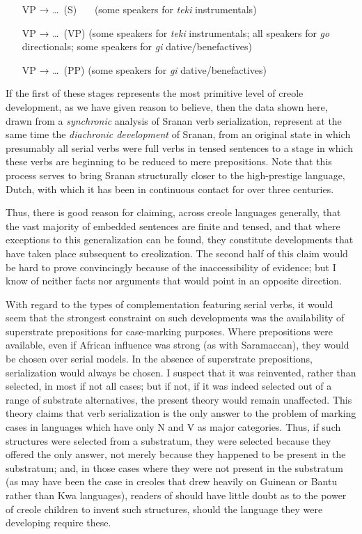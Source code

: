 \ea\label{ex:2:262}
 \hspace{1.5cm}\parbox{9.75cm}{\begin{itemize}
 \item[VP → \ldots~(S)~~~](some speakers for \textit{teki} instrumentals)
 \item[VP → \ldots~(VP)](some speakers for \textit{teki} instrumentals; all speakers for \textit{go} directionals; some speakers for \textit{gi} dative/benefactives)
 \item[VP → \ldots~(PP)](some speakers for \textit{gi} dative/benefactives)
\end{itemize}}
\z

\noindent If the first of these stages represents the most primitive level of creole development, as we have given reason to believe, then the data shown here, drawn from a \textit{synchronic} analysis of Sranan verb serialization, represent at the same time the \textit{diachronic development} of Sranan, from an original state in which presumably all serial verbs were full verbs in tensed sentences to a stage in which these verbs are beginning to be reduced to mere prepositions. Note that this process serves to bring Sranan structurally closer to the high-prestige language, Dutch, with which it has been in continuous contact for over three centuries.

Thus, there is good reason for claiming, across creole languages generally, that the vast majority of embedded sentences are finite and tensed, and that where exceptions to this generalization can be found, they constitute developments that have taken place subsequent to creolization. The second half of this claim would be hard to prove convincingly because of the inaccessibility of evidence; but I know of neither facts nor arguments that would point in an opposite direction.

With regard to the types of complementation featuring serial verbs, it would seem that the strongest constraint on such developments was the availability of superstrate prepositions for case-marking purposes. Where prepositions were available, even if African influence was strong (as with Saramaccan), they would be chosen over serial models. In the absence of superstrate prepositions, serialization would always be chosen. I suspect that it was reinvented, rather than selected,
in most if not all cases; but if not, if it was indeed selected out of a range of substrate alternatives, the present theory would remain unaffected. This theory claims that verb serialization is the only answer to the problem of marking cases in languages which have only N and V as major categories. Thus, if such structures were selected from a substratum, they were selected because they offered the only answer, not merely because they happened to be present in the substratum; and, in those cases where they were not present in the substratum (as may have been the case in creoles that drew heavily on Guinean or Bantu rather than Kwa languages), readers of  should have little doubt as to the power of creole children to invent such structures, should the language they were developing require these.

